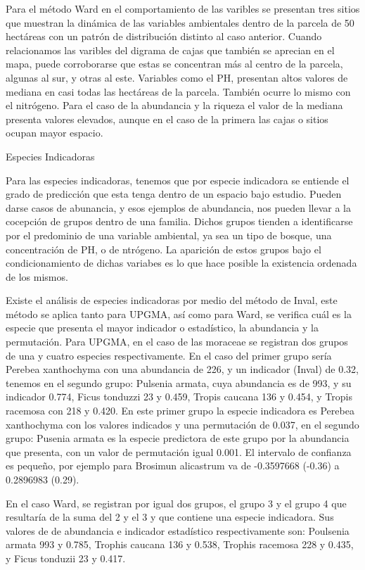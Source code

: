 \documentclass[11pt,]{article}
\begin{document}
Para el método Ward en el comportamiento de las varibles se presentan
tres sitios que muestran la dinámica de las variables ambientales dentro
de la parcela de 50 hectáreas con un patrón de distribución distinto al
caso anterior. Cuando relacionamos las varibles del digrama de cajas que
también se aprecian en el mapa, puede corroborarse que estas se
concentran más al centro de la parcela, algunas al sur, y otras al este.
Variables como el PH, presentan altos valores de mediana en casi todas
las hectáreas de la parcela. También ocurre lo mismo con el nitrógeno.
Para el caso de la abundancia y la riqueza el valor de la mediana
presenta valores elevados, aunque en el caso de la primera las cajas o
sitios ocupan mayor espacio.

Especies Indicadoras

Para las especies indicadoras, tenemos que por especie indicadora se
entiende el grado de predicción que esta tenga dentro de un espacio bajo
estudio. Pueden darse casos de abunancia, y esos ejemplos de abundancia,
nos pueden llevar a la cocepción de grupos dentro de una familia. Dichos
grupos tienden a identificarse por el predominio de una variable
ambiental, ya sea un tipo de bosque, una concentración de PH, o de
ntrógeno. La aparición de estos grupos bajo el condicionamiento de
dichas variabes es lo que hace posible la existencia ordenada de los
mismos.

Existe el análisis de especies indicadoras por medio del método de
Inval, este método se aplica tanto para UPGMA, así como para Ward, se
verifica cuál es la especie que presenta el mayor indicador o
estadístico, la abundancia y la permutación. Para UPGMA, en el caso de
las moraceae se registran dos grupos de una y cuatro especies
respectivamente. En el caso del primer grupo sería Perebea xanthochyma
con una abundancia de 226, y un indicador (Inval) de 0.32, tenemos en el
segundo grupo: Pulsenia armata, cuya abundancia es de 993, y su
indicador 0.774, Ficus tonduzzi 23 y 0.459, Tropis caucana 136 y 0.454,
y Tropis racemosa con 218 y 0.420. En este primer grupo la especie
indicadora es Perebea xanthochyma con los valores indicados y una
permutación de 0.037, en el segundo grupo: Pusenia armata es la especie
predictora de este grupo por la abundancia que presenta, con un valor de
permutación igual 0.001. El intervalo de confianza es pequeño, por
ejemplo para Brosimun alicastrum va de -0.3597668 (-0.36) a 0.2896983
(0.29).

En el caso Ward, se registran por igual dos grupos, el grupo 3 y el
grupo 4 que resultaría de la suma del 2 y el 3 y que contiene una
especie indicadora. Sus valores de de abundancia e indicador estadístico
respectivamente son: Poulsenia armata 993 y 0.785, Trophis caucana 136 y
0.538, Trophis racemosa 228 y 0.435, y Ficus tonduzii 23 y 0.417.
\end{document}
